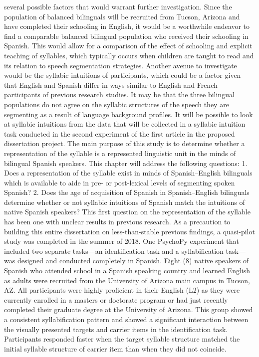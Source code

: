 several possible factors that would warrant further investigation. Since the population of balanced bilinguals will be recruited from Tucson, Arizona and have completed their schooling in English, it would be a worthwhile endeavor to find a comparable balanced bilingual population who received their schooling in Spanish. This would allow for a comparison of the effect of schooling and explicit teaching of syllables, which typically occurs when children are taught to read and its relation to speech segmentation strategies. 
Another avenue to investigate would be the syllabic intuitions of participants, which could be a factor given that English and Spanish differ in ways similar to English and French participants of previous research studies. It may be that the three bilingual populations do not agree on the syllabic structures of the speech they are segmenting as a result of language background profiles. It will be possible to look at syllabic intuitions from the data that will be collected in a syllabic intuition task conducted in the second experiment of the first article in the proposed dissertation project. 
The main purpose of this study is to determine whether a representation of the syllable is a represented linguistic unit in the minds of bilingual Spanish speakers. This chapter will address the following questions:
1.	Does a representation of the syllable exist in minds of Spanish–English bilinguals which is available to aide in pre- or post-lexical levels of segmenting spoken Spanish?
2.	Does the age of acquisition of Spanish in Spanish–English bilinguals determine whether or not syllabic intuitions of Spanish match the intuitions of native Spanish speakers?
This first question on the representation of the syllable has been one with unclear results in previous research. As a precaution to building this entire dissertation on less-than-stable previous findings, a quasi-pilot study was completed in the summer of 2018. One PsychoPy experiment that included two separate tasks—an identification task and a syllabification task—was designed and conducted completely in Spanish. Eight (8) native speakers of Spanish who attended school in a Spanish speaking country and learned English as adults were recruited from the University of Arizona main campus in Tucson, AZ. All participants were highly proficient in their English (L2) as they were currently enrolled in a masters or doctorate program or had just recently completed their graduate degree at the University of Arizona. This group showed a consistent syllabification pattern and showed a significant interaction between the visually presented targets and carrier items in the identification task. Participants responded faster when the target syllable structure matched the initial syllable structure of carrier item than when they did not coincide.
